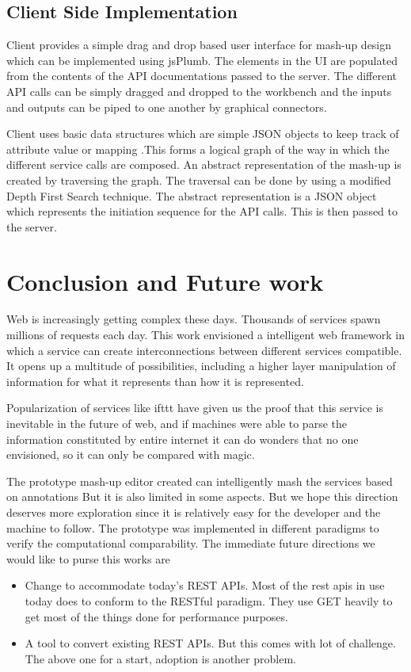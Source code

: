 \documentclass[journal]{IEEEtran}
\begin{document}
\subsection{Client Side Implementation}
Client provides a simple drag and drop based user interface for mash-up design which can be implemented using jsPlumb\cite{jsplumb}. The elements in the UI are populated from the contents of the API documentations passed to the server. The different API calls can be simply dragged and dropped to the workbench and the inputs and outputs can be piped to one another by graphical connectors.

Client uses basic data structures which are simple JSON objects to keep track of attribute value or mapping .This forms a logical graph of the way in which the different service calls are composed. An abstract representation of the mash-up is created by traversing the graph. The traversal can be done by using a modified Depth First Search technique. The abstract representation is a JSON object which represents the initiation sequence for the API calls. This is then passed to the server.


\section{Conclusion and Future work}


Web is increasingly getting complex these days. Thousands of services spawn millions of requests each day. This work envisioned a intelligent web framework in which a service can create interconnections between different services compatible. It opens up a multitude of possibilities, including a higher layer manipulation of information for what it represents than how it is represented.

Popularization of services like ifttt\cite{ift} have given us the proof that this service is inevitable in the future of web, and if machines were able to parse the information constituted by entire internet it can do wonders that no one envisioned, so it can only be compared with magic.

The prototype mash-up editor created can intelligently mash the services based on annotations But it is also limited in some aspects. But we hope this direction deserves more exploration since it is relatively easy for the developer and the machine to follow. The prototype was implemented in different paradigms to verify the computational comparability.
The immediate future directions we would like to purse this works are
\begin{itemize}
\item Change to accommodate today's REST APIs. Most of the rest apis in use today does to conform to the RESTful paradigm. They use GET heavily to get most of the things done for performance purposes.
\item A tool to convert existing REST APIs. But this comes with lot of challenge. The above one for a start, adoption is another problem.
\end{itemize}
\end{document}
